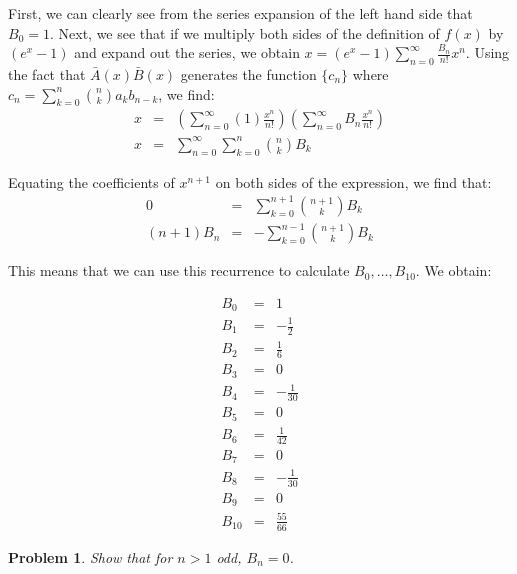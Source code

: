 \documentclass[psamsfonts]{amsart}
\newtheorem{prob}{Problem}[section]
\newenvironment{sol}{{\bfseries Solution}}{\qedsymbol}
\theoremstyle{definition}
\theoremstyle{remark}
\numberwithin{equation}{section}
\begin{document}
\begin{sol}
First, we can clearly see from the series expansion of the left hand side that $B_0 = 1$. Next, we see that if we multiply both sides of the definition of $f(x)$ by $(e^x - 1)$ and expand out the series, we obtain $x = (e^x - 1) \sum_{n=0}^\infty \frac{B_n}{n!} x^n$. Using the fact that $\bar{A}(x) \bar{B}(x)$ generates the function $\{c_n \}$ where $c_n = \sum_{k=0}^n {n \choose k} a_k b_{n-k}$, we find:
\begin{eqnarray}
x &=& \left( \sum_{n=0}^\infty (1) \frac{x^n}{n!} \right) \left( \sum_{n=0}^\infty B_n \frac{x^n}{n!} \right) \\
x &=& \sum_{n=0}^\infty \sum_{k=0}^n {n \choose k } B_k 
\end{eqnarray}

Equating the coefficients of $x^{n+1}$ on both sides of the expression, we find that:
\begin{eqnarray}
0 &=& \sum_{k=0}^{n+1} {n + 1 \choose k } B_k \\
(n+1) B_n &=& - \sum_{k=0}^{n-1} {n + 1 \choose k} B_k
\end{eqnarray}

This means that we can use this recurrence to calculate $B_0, \ldots, B_{10}$. We obtain:

\begin{eqnarray}
B_0 &=& 1 \\
B_1 &=& - \frac{1}{2} \\
 B_2 &=& \frac{1}{6} \\
 B_3 &=& 0 \\
 B_4 &=& - \frac{1}{30} \\
B_5 &=& 0 \\
B_6 &=& \frac{1}{42} \\
B_7 &=& 0 \\
B_8 &=& - \frac{1}{30} \\
B_9 &=& 0 \\
B_{10} &=& \frac{55}{66} 
\end{eqnarray}
\end{sol}

\begin{prob}
Show that for $n > 1$ odd, $B_n = 0$. 
\end{prob}
\end{document}
